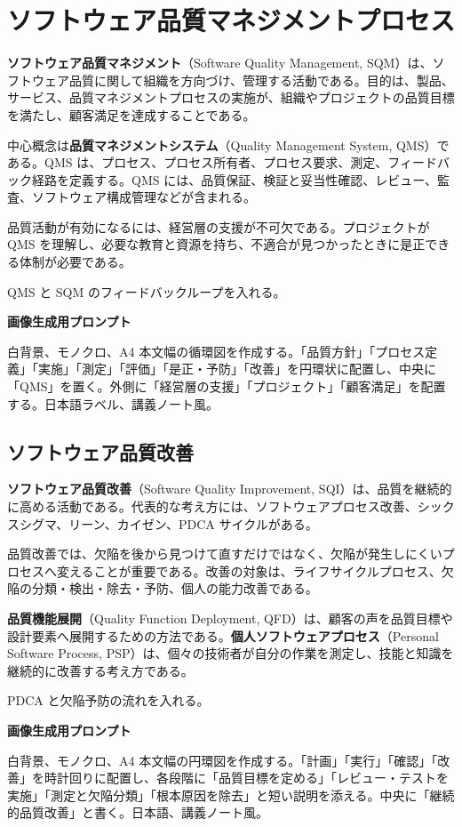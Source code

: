 \documentclass[11pt,a4paper]{article}
\newcommand{\term}[2]{\textbf{#1}（#2）}
\begin{document}
\section{ソフトウェア品質マネジメントプロセス}
\term{ソフトウェア品質マネジメント}{Software Quality Management, SQM}は、ソフトウェア品質に関して組織を方向づけ、管理する活動である。目的は、製品、サービス、品質マネジメントプロセスの実施が、組織やプロジェクトの品質目標を満たし、顧客満足を達成することである。

中心概念は\term{品質マネジメントシステム}{Quality Management System, QMS}である。QMS は、プロセス、プロセス所有者、プロセス要求、測定、フィードバック経路を定義する。QMS には、品質保証、検証と妥当性確認、レビュー、監査、ソフトウェア構成管理などが含まれる。

品質活動が有効になるには、経営層の支援が不可欠である。プロジェクトが QMS を理解し、必要な教育と資源を持ち、不適合が見つかったときに是正できる体制が必要である。

\begin{todobox}
QMS と SQM のフィードバックループを入れる。\par
\textbf{画像生成用プロンプト}\par
白背景、モノクロ、A4 本文幅の循環図を作成する。「品質方針」「プロセス定義」「実施」「測定」「評価」「是正・予防」「改善」を円環状に配置し、中央に「QMS」を置く。外側に「経営層の支援」「プロジェクト」「顧客満足」を配置する。日本語ラベル、講義ノート風。
\end{todobox}

\subsection{ソフトウェア品質改善}
\term{ソフトウェア品質改善}{Software Quality Improvement, SQI}は、品質を継続的に高める活動である。代表的な考え方には、ソフトウェアプロセス改善、シックスシグマ、リーン、カイゼン、PDCA サイクルがある。

品質改善では、欠陥を後から見つけて直すだけではなく、欠陥が発生しにくいプロセスへ変えることが重要である。改善の対象は、ライフサイクルプロセス、欠陥の分類・検出・除去・予防、個人の能力改善である。

\term{品質機能展開}{Quality Function Deployment, QFD}は、顧客の声を品質目標や設計要素へ展開するための方法である。\term{個人ソフトウェアプロセス}{Personal Software Process, PSP}は、個々の技術者が自分の作業を測定し、技能と知識を継続的に改善する考え方である。

\begin{todobox}
PDCA と欠陥予防の流れを入れる。\par
\textbf{画像生成用プロンプト}\par
白背景、モノクロ、A4 本文幅の円環図を作成する。「計画」「実行」「確認」「改善」を時計回りに配置し、各段階に「品質目標を定める」「レビュー・テストを実施」「測定と欠陥分類」「根本原因を除去」と短い説明を添える。中央に「継続的品質改善」と書く。日本語、講義ノート風。
\end{todobox}
\end{document}
